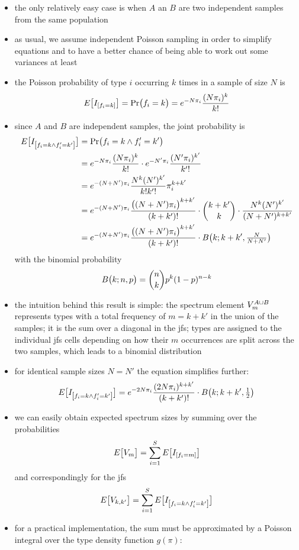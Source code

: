 \documentclass[a4paper]{article}
\begin{document}
\begin{itemize}
\item the only relatively easy case is when $A$ an $B$ are two independent samples from the same population
\item as usual, we assume independent Poisson sampling in order to simplify equations and to have a better chance of being able to work out some variances at least
\item the Poisson probability of type $i$ occurring $k$ times in a sample of size $N$ is
  \[ 
    E_{}\bigl[I_{\left[f_i =k\right]}\bigr] = \mathop{\mathrm{Pr}}\bigl(f_i = k\bigr) = e^{-N\pi_i} \frac{(N\pi_i)^{k}}{k!}
  \]
\item since $A$ and $B$ are independent samples, the joint probability is
  \begin{align*}
    E_{}\bigl[I_{\left[f_i = k \wedge f'_i = k'\right]}\bigr]
    &= \mathop{\mathrm{Pr}}\bigl(f_i = k \wedge f'_i = k'\bigr) \\
    &= e^{-N\pi_i} \frac{(N\pi_i)^{k}}{k!} \cdot e^{-N'\pi_i} \frac{(N'\pi_i)^{k'}}{k'!} \\
    &= e^{-(N + N') \pi_i} \frac{N^k (N')^{k'}}{k! k'!} \pi_i^{k + k'} \\
    &= e^{-(N + N') \pi_i} \frac{\bigl( (N + N') \pi_i \bigr)^{k + k'}}{(k + k')!}\cdot
      \binom{k+k'}{k}\cdot  \frac{N^k (N')^{k'}}{(N + N')^{k + k'}} \\
    &= e^{-(N + N') \pi_i} \frac{\bigl( (N + N') \pi_i \bigr)^{k + k'}}{(k + k')!}\cdot
      B\bigl(k; k + k', \tfrac{N}{N + N'}\bigr)
  \end{align*}
  with the binomial probability
  \[
    B\bigl(k; n, p\bigr) = \binom{n}{k} p^k (1 - p)^{n - k}
  \]
\item the intuition behind this result is simple: the spectrum element $V^{A\cup B}_m$ represents types with a total frequency of $m = k + k'$ in the union of the samples; it is the sum over a diagonal in the jfs; types are assigned to the individual jfs cells depending on how their $m$ occurrences are split across the two samples, which leads to a binomial distribution  
\item for identical sample sizes $N = N'$ the equation simplifies further:
  \[
    E_{}\bigl[I_{\left[f_i = k \wedge f'_i = k'\right]}\bigr]
    = e^{-2N \pi_i} \frac{(2N \pi_i)^{k + k'}}{(k + k')!}\cdot B\bigl(k; k + k', \tfrac12\bigr)
  \]
\item we can easily obtain expected spectrum sizes by summing over the probabilities
  \[
    E_{}\bigl[V_m\bigr] = \sum_{i=1}^{S} E_{}\bigl[I_{\left[f_i = m\right]}\bigr] 
  \]
  and correspondingly for the jfs
  \[
    E_{}\bigl[V_{k, k'}\bigr] = \sum_{i=1}^{S} E_{}\bigl[I_{\left[f_i = k \wedge f'_i = k'\right]}\bigr] 
  \]
\item for a practical implementation, the sum must be approximated by a Poisson integral over the type density function $g(\pi)$:

\end{itemize}
\end{document}
